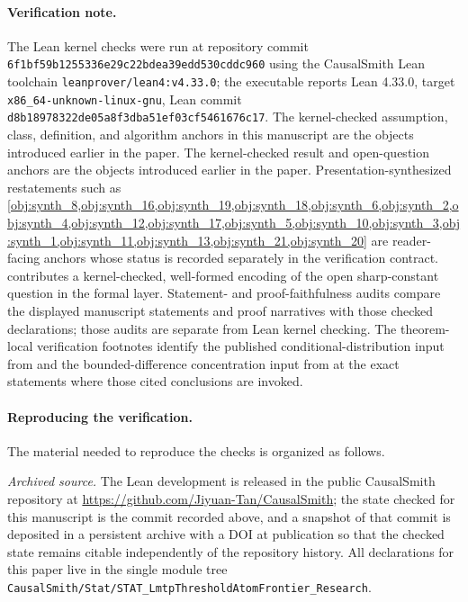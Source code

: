 \paragraph{Verification note.}
The Lean kernel checks were run at repository commit \texttt{6f1bf59b1255336e29c22bdea39edd530cddc960} using the CausalSmith Lean toolchain \texttt{leanprover/lean4:v4.33.0}; the executable reports Lean 4.33.0, target \texttt{x86\_64-unknown-linux-gnu}, Lean commit \texttt{d8b18978322de05a8f3dba51ef03cf5461676c17}. The kernel-checked assumption, class, definition, and algorithm anchors in this manuscript are the objects introduced earlier in the paper. The kernel-checked result and open-question anchors are the objects introduced earlier in the paper. Presentation-synthesized restatements such as \cref{obj:synth_8,obj:synth_16,obj:synth_19,obj:synth_18,obj:synth_6,obj:synth_2,obj:synth_4,obj:synth_12,obj:synth_17,obj:synth_5,obj:synth_10,obj:synth_3,obj:synth_1,obj:synth_11,obj:synth_13,obj:synth_21,obj:synth_20} are reader-facing anchors whose status is recorded separately in the verification contract.  contributes a kernel-checked, well-formed encoding of the open sharp-constant question in the formal layer. Statement- and proof-faithfulness audits compare the displayed manuscript statements and proof narratives with those checked declarations; those audits are separate from Lean kernel checking. The theorem-local verification footnotes identify the published conditional-distribution input from \citet{Kallenberg2002Foundations} and the bounded-difference concentration input from \citet{Hoeffding1963} at the exact statements where those cited conclusions are invoked.

\paragraph{Reproducing the verification.}
The material needed to reproduce the checks is organized as follows.

\emph{Archived source.}  The Lean development is released in the public CausalSmith repository at \url{https://github.com/Jiyuan-Tan/CausalSmith}; the state checked for this manuscript is the commit recorded above, and a snapshot of that commit is deposited in a persistent archive with a DOI at publication so that the checked state remains citable independently of the repository history.  All declarations for this paper live in the single module tree \texttt{CausalSmith/Stat/STAT\_LmtpThresholdAtomFrontier\_Research}.

